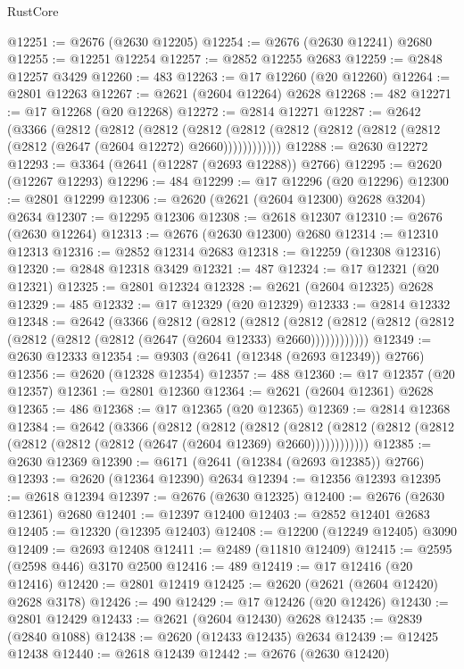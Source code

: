 \begin{lexlean}{RustCore}
\begin{coremodule}
@12251 := @2676 (@2630 @12205)
@12254 := @2676 (@2630 @12241) @2680
@12255 := @12251 @12254
@12257 := @2852 @12255 @2683
@12259 := @2848 @12257 @3429
@12260 := 483
@12263 := @17 @12260 (@20 @12260)
@12264 := @2801 @12263
@12267 := @2621 (@2604 @12264) @2628
@12268 := 482
@12271 := @17 @12268 (@20 @12268)
@12272 := @2814 @12271
@12287 := @2642
    (@3366
      (@2812
        (@2812
          (@2812
            (@2812 (@2812 (@2812 (@2812 (@2812 (@2812 (@2812 (@2647 (@2604 @12272) @2660))))))))))))
@12288 := @2630 @12272
@12293 := @3364 (@2641 (@12287 (@2693 @12288)) @2766)
@12295 := @2620 (@12267 @12293)
@12296 := 484
@12299 := @17 @12296 (@20 @12296)
@12300 := @2801 @12299
@12306 := @2620 (@2621 (@2604 @12300) @2628 @3204) @2634
@12307 := @12295 @12306
@12308 := @2618 @12307
@12310 := @2676 (@2630 @12264)
@12313 := @2676 (@2630 @12300) @2680
@12314 := @12310 @12313
@12316 := @2852 @12314 @2683
@12318 := @12259 (@12308 @12316)
@12320 := @2848 @12318 @3429
@12321 := 487
@12324 := @17 @12321 (@20 @12321)
@12325 := @2801 @12324
@12328 := @2621 (@2604 @12325) @2628
@12329 := 485
@12332 := @17 @12329 (@20 @12329)
@12333 := @2814 @12332
@12348 := @2642
    (@3366
      (@2812
        (@2812
          (@2812
            (@2812 (@2812 (@2812 (@2812 (@2812 (@2812 (@2812 (@2647 (@2604 @12333) @2660))))))))))))
@12349 := @2630 @12333
@12354 := @9303 (@2641 (@12348 (@2693 @12349)) @2766)
@12356 := @2620 (@12328 @12354)
@12357 := 488
@12360 := @17 @12357 (@20 @12357)
@12361 := @2801 @12360
@12364 := @2621 (@2604 @12361) @2628
@12365 := 486
@12368 := @17 @12365 (@20 @12365)
@12369 := @2814 @12368
@12384 := @2642
    (@3366
      (@2812
        (@2812
          (@2812
            (@2812 (@2812 (@2812 (@2812 (@2812 (@2812 (@2812 (@2647 (@2604 @12369) @2660))))))))))))
@12385 := @2630 @12369
@12390 := @6171 (@2641 (@12384 (@2693 @12385)) @2766)
@12393 := @2620 (@12364 @12390) @2634
@12394 := @12356 @12393
@12395 := @2618 @12394
@12397 := @2676 (@2630 @12325)
@12400 := @2676 (@2630 @12361) @2680
@12401 := @12397 @12400
@12403 := @2852 @12401 @2683
@12405 := @12320 (@12395 @12403)
@12408 := @12200 (@12249 @12405) @3090
@12409 := @2693 @12408
@12411 := @2489 (@11810 @12409)
@12415 := @2595 (@2598 @446) @3170 @2500
@12416 := 489
@12419 := @17 @12416 (@20 @12416)
@12420 := @2801 @12419
@12425 := @2620 (@2621 (@2604 @12420) @2628 @3178)
@12426 := 490
@12429 := @17 @12426 (@20 @12426)
@12430 := @2801 @12429
@12433 := @2621 (@2604 @12430) @2628
@12435 := @2839 (@2840 @1088)
@12438 := @2620 (@12433 @12435) @2634
@12439 := @12425 @12438
@12440 := @2618 @12439
@12442 := @2676 (@2630 @12420)

\end{coremodule}
\end{lexlean}
